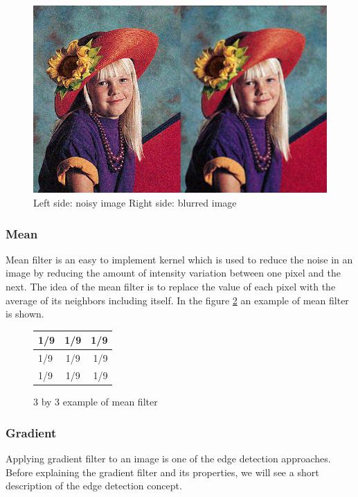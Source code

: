 \documentclass{article}
\begin{document}
	\begin{figure} [H]
		\centering
		\includegraphics[scale=0.3]{images/noisy_removed}
		\caption{Left side: noisy image Right side: blurred image \label{crop_1}}
	\end{figure}


		\subsubsection{Mean}
			Mean filter is an easy to implement kernel which is used to reduce the noise in an image by reducing the amount of intensity variation between one
			pixel and the next. The idea of the mean filter is to replace the value of each pixel with the average of its neighbors including itself. In the figure \ref{mean} an example of mean filter is shown.
\begin{figure}[H]
\begin{center}
 \begin{tabular}{ | l | c | r | }
    \hline
    1/9 & 1/9 & 1/9 \\ \hline
    1/9 & 1/9 & 1/9 \\ \hline
    1/9 & 1/9 & 1/9 \\
    \hline
  \end{tabular}
\end{center}
\caption{3 by 3 example of mean filter \label{mean}}\end{figure}
		
		\subsubsection{Gradient}

			Applying gradient filter to an image is one of the edge detection approaches. Before explaining the gradient filter and its properties, we will see a
			short description of the edge detection concept. 
			
\end{document}
